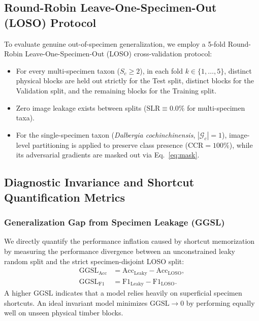 \documentclass[a4paper,fleqn]{cas-sc}
\begin{document}
\subsection{Round-Robin Leave-One-Specimen-Out (LOSO) Protocol}
To evaluate genuine out-of-specimen generalization, we employ a 5-fold Round-Robin Leave-One-Specimen-Out (LOSO) cross-validation protocol:
\begin{itemize}
    \item For every multi-specimen taxon ($S_c \ge 2$), in each fold $k \in \{1,\dots,5\}$, distinct physical blocks are held out strictly for the Test split, distinct blocks for the Validation split, and the remaining blocks for the Training split.
    \item Zero image leakage exists between splits ($\mathrm{SLR} \equiv 0.0\%$ for multi-specimen taxa).
    \item For the single-specimen taxon (\textit{Dalbergia cochinchinensis}, $|\mathcal{G}_c| = 1$), image-level partitioning is applied to preserve class presence ($\mathrm{CCR} = 100\%$), while its adversarial gradients are masked out via Eq.~\eqref{eq:mask}.
\end{itemize}

\subsection{Diagnostic Invariance and Shortcut Quantification Metrics}

\subsubsection{Generalization Gap from Specimen Leakage (GGSL)}
We directly quantify the performance inflation caused by shortcut memorization by measuring the performance divergence between an unconstrained leaky random split and the strict specimen-disjoint LOSO split:
\begin{align}
    \mathrm{GGSL}_{\text{Acc}} &= \mathrm{Acc}_{\text{Leaky}} - \mathrm{Acc}_{\text{LOSO}}, \label{eq:ggsl_acc} \\
    \mathrm{GGSL}_{\text{F1}} &= \mathrm{F1}_{\text{Leaky}} - \mathrm{F1}_{\text{LOSO}}. \label{eq:ggsl_f1}
\end{align}
A higher $\mathrm{GGSL}$ indicates that a model relies heavily on superficial specimen shortcuts. An ideal invariant model minimizes $\mathrm{GGSL} \to 0$ by performing equally well on unseen physical timber blocks.
\end{document}
